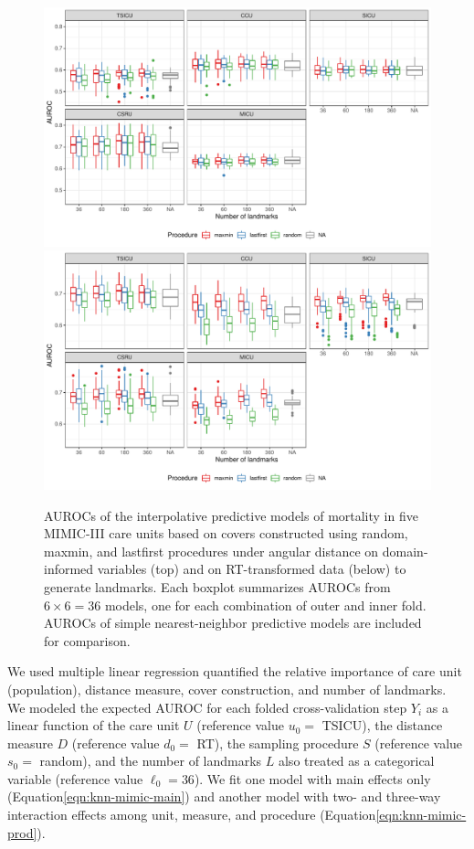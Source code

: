 \documentclass{article}
\begin{document}
\begin{figure}
\includegraphics[width=\textwidth,trim=0 55 0 0,clip=true]{../figures/knn-cos-auc-2}
\includegraphics[width=\textwidth]{../figures/knn-rt-auc-2}
\caption{
AUROCs of the interpolative predictive models of mortality in five MIMIC-III care units based on covers constructed using random, maxmin, and lastfirst procedures under angular distance on domain-informed variables (top) and on RT-transformed data (below) to generate landmarks.
Each boxplot summarizes AUROCs from $6 \times 6 = 36$ models, one for each combination of outer and inner fold.
AUROCs of simple nearest-neighbor predictive models are included for comparison.
\label{fig:knn-mimic-cos-rt}
}
\end{figure}

We used multiple linear regression quantified the relative importance of
care unit (population), distance measure, cover construction, and number
of landmarks. We modeled the expected AUROC for each folded
cross-validation step \(Y_i\) as a linear function of the care unit
\(U\) (reference value \(u_0 =\) TSICU), the distance measure \(D\)
(reference value \(d_0 =\) RT), the sampling procedure \(S\) (reference
value \(s_0 =\) random), and the number of landmarks \(L\) also treated
as a categorical variable (reference value \(\ell_0 = 36\)). We fit one
model with main effects only (Equation\nbs\ref{eqn:knn-mimic-main}) and
another model with two- and three-way interaction effects among unit,
measure, and procedure (Equation\nbs\ref{eqn:knn-mimic-prod}).
\end{document}
